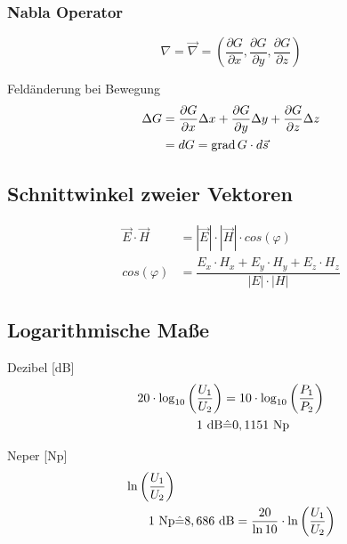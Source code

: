 \subsubsection*{Nabla Operator}
\[
    \nabla = \vec{\nabla} = \left( \dfrac{\partial G}{\partial x},
    \dfrac{\partial G}{\partial y}, \dfrac{\partial G}{\partial z} \right)
\]

Feldänderung bei Bewegung
\begin{align*}
    \Delta G & = \dfrac{\partial G}{\partial x} \Delta x + \dfrac{\partial G}{\partial y} \Delta y + \dfrac{\partial G}{\partial z} \Delta z \\
             & = dG = \operatorname{grad} G \cdot d \vec{s}
\end{align*}

\subsection{Schnittwinkel zweier Vektoren}
\begin{align*}
    \vec{E} \cdot \vec{H} & = |\vec{E}| \cdot |\vec{H}| \cdot cos(\varphi)                         \\
    cos(\varphi)          & = \dfrac{E_x \cdot H_x + E_y \cdot H_y + E_z \cdot H_z}{|E| \cdot |H|}
\end{align*}

\subsection{Logarithmische Maße}
\begin{description}
    \item Dezibel [dB]
          \begin{align*}
              20 \cdot \log_{10} \left( \dfrac{U_1}{U_2}\right) & = 10 \cdot \log_{10} \left( \dfrac{P_1}{P_2}\right) \\
              1 \textnormal{ dB}                                & \hat{=} 0,1151 \textnormal{ Np}
          \end{align*}

    \item Neper [Np]
          \begin{align*}
              \ln \left(\dfrac{U_1}{U_2}\right) &                                                                                             \\
              1 \textnormal{ Np}                & \hat{=} 8,686 \textnormal{ dB} =\dfrac{20}{\ln 10} \cdot \ln \left( \dfrac{U_1}{U_2}\right)
          \end{align*}
\end{description}

